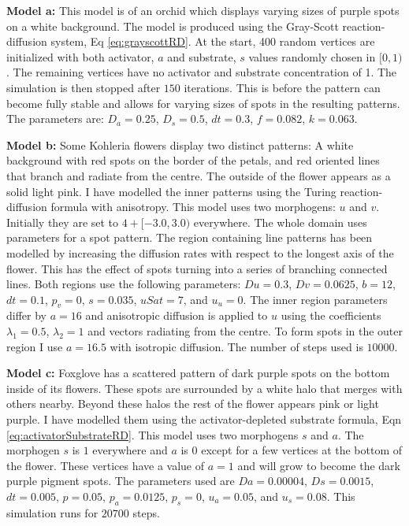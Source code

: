 \textbf{Model a:} 
This model is of an orchid which displays varying sizes of purple spots on a white background. The model is produced using the Gray-Scott reaction-diffusion system, Eq \ref{eq:grayscottRD}. At the start, 400 random vertices are initialized with both activator, $a$ and substrate, $s$ values randomly chosen in $[0, 1)$. The remaining vertices have no activator and substrate concentration of 1. The simulation is then stopped after $150$ iterations. This is before the pattern can become fully stable and allows for varying sizes of spots in the resulting patterns. The parameters are: $D_a = 0.25$, $D_s = 0.5$, $dt = 0.3$, $f = 0.082$, $k = 0.063$.

\textbf{Model b:}
Some Kohleria flowers display two distinct patterns: A white background with red spots on the border of the petals, and red oriented lines that branch and radiate from the centre. The outside of the flower appears as a solid light pink. I have modelled the inner patterns using the Turing reaction-diffusion formula with anisotropy. This model uses two morphogens: $u$ and $v$. Initially they are set to $4 + [-3.0, 3.0)$ everywhere. The whole domain uses parameters for a spot pattern. The region containing line patterns has been modelled by increasing the diffusion rates with respect to the longest axis of the flower. This has the effect of spots turning into a series of branching connected lines. Both regions use the following parameters: $Du=0.3$, $Dv=0.0625$, $b=12$, $dt=0.1$, $p_v=0$, $s=0.035$, $uSat=7$, and $u_u=0$. The inner region parameters differ by $a=16$ and anisotropic diffusion is applied to $u$ using the coefficients $\lambda_{1}=0.5$, $\lambda_{2}=1$ and vectors radiating from the centre. To form spots in the outer region I use $a=16.5$ with isotropic diffusion. The number of steps used is $10000$.

\textbf{Model c:}
Foxglove has a scattered pattern of dark purple spots on the bottom inside of its flowers. These spots are surrounded by a white halo that merges with others nearby. Beyond these halos the rest of the flower appears pink or light purple. I have modelled them using the activator-depleted substrate formula, Eqn \ref{eq:activatorSubstrateRD}. This model uses two morphogens $s$ and $a$. The morphogen $s$ is $1$ everywhere and $a$ is $0$ except for a few vertices at the bottom of the flower. These vertices have a value of $a=1$ and will grow to become the dark purple pigment spots. The parameters used are $Da=0.00004$, $Ds=0.0015$, $dt=0.005$, $p=0.05$, $p_a=0.0125$, $p_s=0$, $u_a=0.05$, and $u_s=0.08$. This simulation runs for $20700$ steps.

